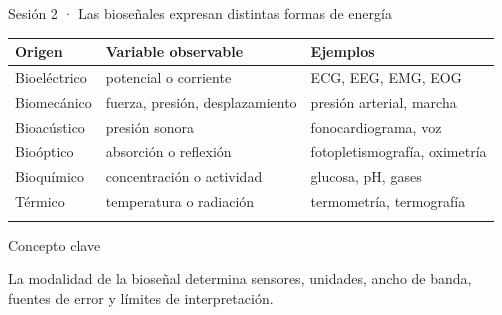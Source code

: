 \documentclass[
  10pt,
  ignorenonframetext,
  aspectratio=169,
  spanish,
]{beamer}
\begin{document}
\begin{frame}{Sesión 2 · Las bioseñales expresan distintas formas de
energía}
\label{d1-017}
\begin{longtable}[]{@{}
  >{\raggedright\arraybackslash}p{}
  >{\raggedright\arraybackslash}p{}
  >{\raggedright\arraybackslash}p{}@{}}
\toprule\noalign{}
\begin{minipage}[b]{\linewidth}\raggedright
Origen
\end{minipage} & \begin{minipage}[b]{\linewidth}\raggedright
Variable observable
\end{minipage} & \begin{minipage}[b]{\linewidth}\raggedright
Ejemplos
\end{minipage} \\
\midrule\noalign{}
\endhead
Bioeléctrico & potencial o corriente & ECG, EEG, EMG, EOG \\
Biomecánico & fuerza, presión, desplazamiento & presión arterial,
marcha \\
Bioacústico & presión sonora & fonocardiograma, voz \\
Bioóptico & absorción o reflexión & fotopletismografía, oximetría \\
Bioquímico & concentración o actividad & glucosa, \(\mathrm{pH}\),
gases \\
Térmico & temperatura o radiación & termometría, termografía \\
\bottomrule\noalign{}
\end{longtable}

\begin{block}{Concepto clave}

La modalidad de la bioseñal determina sensores, unidades, ancho de
banda, fuentes de error y límites de interpretación.

\end{block}

\end{frame}
\end{document}
